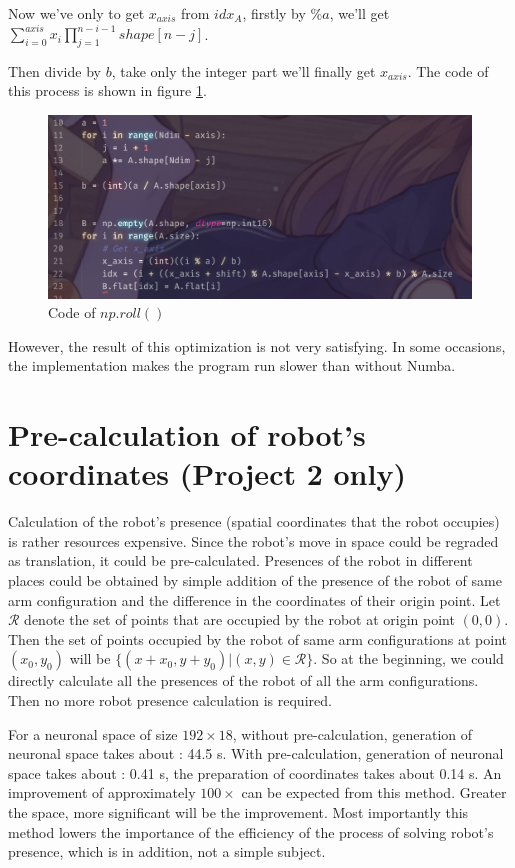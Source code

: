 Now we've only to get $x_{axis}$ from $idx_A$, firstly by $\%a$, we'll get $\sum^{axis}_{i=0}x_i\prod^{n-i-1}_{j=1}shape[n-j]$.

Then divide by $b$, take only the integer part we'll finally get $x_{axis}$.
The code of this process is shown in figure \ref{fig:nproll}.

\begin{figure}[!htb]
    \centering\includegraphics[width=0.6\linewidth]{Figs/implementationOfNpRoll.png}
    \caption{Code of $np.roll()$}
    \label{fig:nproll}
\end{figure}

However, the result of this optimization is not very satisfying. 
In some occasions, the implementation makes the program run slower than without Numba. 

\section{Pre-calculation of robot's coordinates (Project 2 only)}
\label{sec:optimizaiton_Precalculation}

Calculation of the robot's presence (spatial coordinates that the robot occupies) is rather resources expensive.
Since the robot's move in space could be regraded as translation, it could be pre-calculated.
Presences of the robot in different places could be obtained by simple addition of the presence of the robot of same arm configuration
and the difference in the coordinates of their origin point.
Let $ \mathcal{R} $ denote the set of points that are occupied by the robot at origin point $(0, 0)$.
Then the set of points occupied by the robot of same arm configurations at point $(x_0, y_0)$
will be $\{(x + x_0, y + y_0)|(x,y)\in\mathcal{R}\}$.
So at the beginning, we could directly calculate all the presences of the robot of all the arm configurations.
Then no more robot presence calculation is required.

For a neuronal space of size $ 192 \times 18 $,
without pre-calculation, generation of neuronal space takes about : 44.5 s.
With pre-calculation, generation of neuronal space takes about : 0.41 s, the preparation
of coordinates takes about 0.14 s.
An improvement of approximately $100\times$ can be expected from this method.
Greater the space, more significant will be the improvement.
Most importantly this method lowers the importance of the efficiency of the process of solving robot’s presence,
which is in addition, not a simple subject.